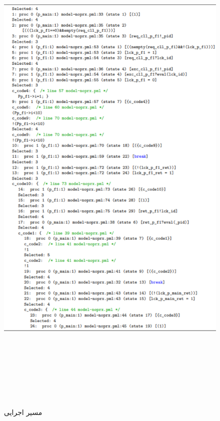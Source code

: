  \begin{figure}
	\centering
	\includegraphics[height=25cm,width=16cm]{e.png}
	\caption{مسیر اجرایی}
	\centering
\end{figure}


